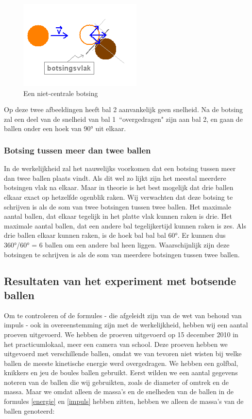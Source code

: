\documentclass[12pt,a4paper]{article}
\begin{document}
	\begin{figure}[h]
		\centerline{\includegraphics{Plaatjes/BotsingSchuin.png}}
		\caption{Een niet-centrale botsing}
		\label{botsingschuin}
	\end{figure}
	
	Op deze twee afbeeldingen heeft bal 2 aanvankelijk geen snelheid. Na de botsing zal een deel van de snelheid van bal 1\ ``overgedragen" zijn aan bal 2, en gaan de ballen onder een hoek van 90° uit elkaar.

	\subsubsection{Botsing tussen meer dan twee ballen}
	In de werkelijkheid zal het nauwelijks voorkomen dat een botsing tussen meer dan twee ballen plaats vindt. Als dit wel zo lijkt zijn het meestal meerdere botsingen vlak na elkaar. Maar in theorie is het best mogelijk dat drie ballen elkaar exact op hetzelfde ogenblik raken. Wij verwachten dat deze botsing te schrijven is als de som van twee botsingen tussen twee ballen.
	Het maximale aantal ballen, dat elkaar tegelijk in het platte vlak kunnen raken is drie. Het maximale aantal ballen, dat een andere bal tegelijkertijd kunnen raken is zes. Als drie ballen elkaar kunnen raken, is de hoek bal bal bal 60°. Er kunnen dus 360°/60° = 6 ballen om een andere bal heen liggen. Waarschijnlijk zijn deze botsingen te schrijven is als de som van meerdere botsingen tussen twee ballen.

	\subsection{Resultaten van het experiment met botsende ballen}
	Om te controleren of de formules - die afgeleidt zijn van de wet van behoud van impuls - ook in overeenstemming zijn met de werkelijkheid, hebben wij een aantal proeven uitgevoerd. We hebben de proeven uitgevoerd op 15 december 2010 in het practicumlokaal, meer een camera van school. Deze proeven hebben we uitgevoerd met verschillende ballen, omdat we van tevoren niet wisten bij welke ballen de meeste kinetische energie werd overgedragen. We hebben een golfbal, knikkers en jeu de boules ballen gebruikt. Eerst wilden we een aantal gegevens noteren van de ballen die wij gebruikten, zoals de diameter of omtrek en de massa. Maar we omdat alleen de massa's en de snelheden van de ballen in de formules \eqref{energie} en \eqref{impuls} hebben zitten, hebben we alleen de massa's van de ballen genoteerd:
\end{document}
